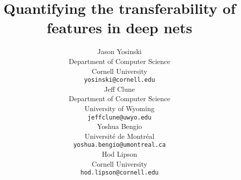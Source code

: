\documentclass{article} %
\title{Quantifying the transferability of features in deep nets}
\author{
Jason Yosinski \\
Department of Computer Science\\
Cornell University \\
\texttt{yosinski@cornell.edu} \\
\And
Jeff Clune \\
Department of Computer Science \\
University of Wyoming \\
\texttt{jeffclune@uwyo.edu} \\
\AND
Yoshua Bengio \\
Universit\'{e} de Montr\'{e}al \\
\texttt{yoshua.bengio@umontreal.ca} \\
\And
Hod Lipson \\
Cornell University \\
\texttt{hod.lipson@cornell.edu} \\
}
\begin{document}
\maketitle

\begin{abstract}

\end{abstract}





%



{\small
%


}
\end{document}
